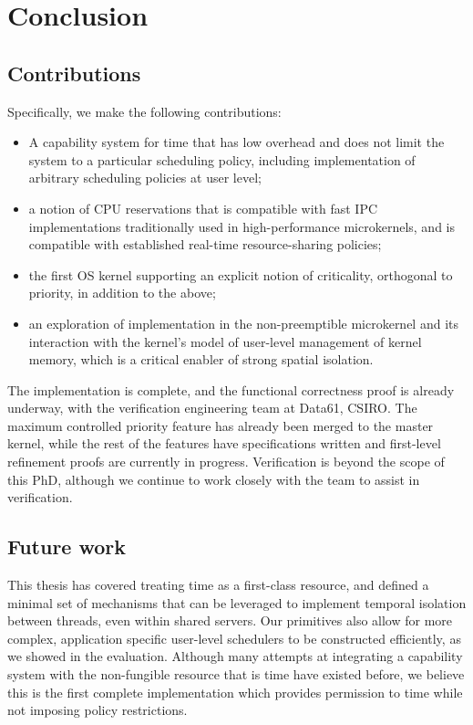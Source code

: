 \chapter{Conclusion}
\label{chap:conclusion}


\section{Contributions}

Specifically, we make the following contributions:
\begin{itemize}
\item A capability system for time that has low overhead and does not
  limit the system to a particular scheduling policy, including
  implementation of arbitrary scheduling policies at user level;
\item a notion of CPU reservations that is compatible with
  fast IPC implementations traditionally used in high-performance
  microkernels, and is compatible with established real-time resource-sharing policies;
\item the first OS kernel supporting an explicit notion of
  criticality, orthogonal to priority, in addition to the above;
\item an exploration of implementation in the non-preemptible \selfour
  microkernel and its interaction with the kernel's model of
  user-level management of kernel memory, which is a critical enabler
  of strong spatial isolation.
\end{itemize}

The implementation is complete, and the functional correctness proof is already underway, with the
verification engineering team at Data61, CSIRO. The maximum controlled
priority feature has already been merged to the master kernel, while the rest of the features have
specifications written and first-level refinement proofs are currently in progress. Verification is
beyond the scope of this PhD, although we continue to work closely with the team to assist in
verification. 


\section{Future work}

This thesis has covered treating time as a first-class resource, and defined a minimal set of
mechanisms that can be leveraged to implement temporal isolation between threads, even within shared
servers. Our primitives also allow for more complex, application specific user-level schedulers to
be constructed efficiently, as we showed in the evaluation. Although many attempts at integrating a
capability system with the non-fungible resource that is time have existed before, we believe this is
the first complete implementation which provides permission to time while not imposing policy
restrictions. 

